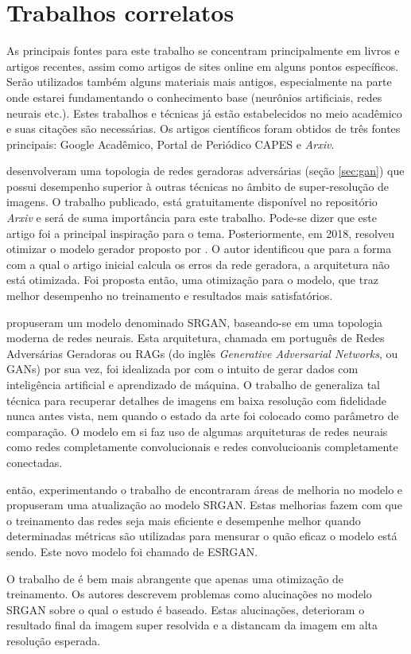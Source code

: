 \section{Trabalhos correlatos}

As principais fontes para este trabalho se concentram principalmente em livros e artigos recentes, assim como artigos de sites online em alguns pontos específicos. Serão utilizados também alguns materiais mais antigos, especialmente na parte onde estarei fundamentando o conhecimento base (neurônios artificiais, redes neurais etc.). Estes trabalhos e técnicas já estão estabelecidos no meio acadêmico e suas citações são necessárias. Os artigos científicos foram obtidos de três fontes principais: Google Acadêmico, Portal de Periódico CAPES e \textit{Arxiv}.

 desenvolveram uma topologia de redes geradoras adversárias (seção \ref{sec:gan}) que possui desempenho superior à outras técnicas no âmbito de super-resolução de imagens. O trabalho publicado, está gratuitamente disponível no repositório \textit{Arxiv} e será de suma importância para este trabalho. Pode-se dizer que este artigo foi a principal inspiração para o tema. Posteriormente, em 2018,  resolveu otimizar o modelo gerador proposto por . O autor identificou que para a forma com a qual o artigo inicial calcula os erros da rede geradora, a arquitetura não está otimizada. Foi proposta então, uma otimização para o modelo, que traz melhor desempenho no treinamento e resultados mais satisfatórios.

 propuseram um modelo denominado SRGAN, baseando-se em uma topologia moderna de redes neurais. Esta arquitetura, chamada em português de Redes Adversárias Geradoras ou RAGs (do inglês \textit{Generative Adversarial Networks}, ou GANs) por sua vez, foi idealizada por  com o intuito de gerar dados com inteligência artificial e aprendizado de máquina. O trabalho de  generaliza tal técnica para recuperar detalhes de imagens em baixa resolução com fidelidade nunca antes vista, nem quando o estado da arte foi colocado como parâmetro de comparação. O modelo em si faz uso de algumas arquiteturas de redes neurais como redes completamente convolucionais e redes convolucioanis completamente conectadas. 

 então, experimentando o trabalho de  encontraram áreas de melhoria no modelo e propuseram uma atualização ao modelo SRGAN. Estas melhorias fazem com que o treinamento das redes seja mais eficiente e desempenhe melhor quando determinadas métricas são utilizadas para mensurar o quão eficaz o modelo está sendo. Este novo modelo foi chamado de ESRGAN. 

O trabalho de  é bem mais abrangente que apenas uma otimização de treinamento. Os autores descrevem problemas como alucinações no modelo SRGAN sobre o qual o estudo é baseado. Estas alucinações, deterioram o resultado final da imagem super resolvida e a distancam da imagem em alta resolução esperada.